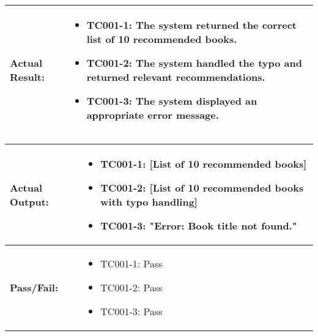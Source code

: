 \documentclass{article}
\begin{document}
\noindent
\begin{tabularx}{\textwidth}{|>{\raggedright\arraybackslash}p{4cm}|X|}
    \hline
    \textbf{Actual Result:} & 
    \begin{itemize}
        \item TC001-1: The system returned the correct list of 10 recommended books.
        \item TC001-2: The system handled the typo and returned relevant recommendations.
        \item TC001-3: The system displayed an appropriate error message.
    \end{itemize}
    \\ \hline
\end{tabularx}

\noindent
\begin{tabularx}{\textwidth}{|>{\raggedright\arraybackslash}p{4cm}|X|}
    \hline
    \textbf{Actual Output:} & 
    \begin{itemize}
        \item TC001-1: [List of 10 recommended books]
        \item TC001-2: [List of 10 recommended books with typo handling]
        \item TC001-3: "Error: Book title not found."
    \end{itemize}
    \\ \hline
    \textbf{Pass/Fail:} & 
    \begin{itemize}
        \item TC001-1: Pass
        \item TC001-2: Pass
        \item TC001-3: Pass
    \end{itemize}
    \\ \hline
\end{tabularx}
\end{document}

